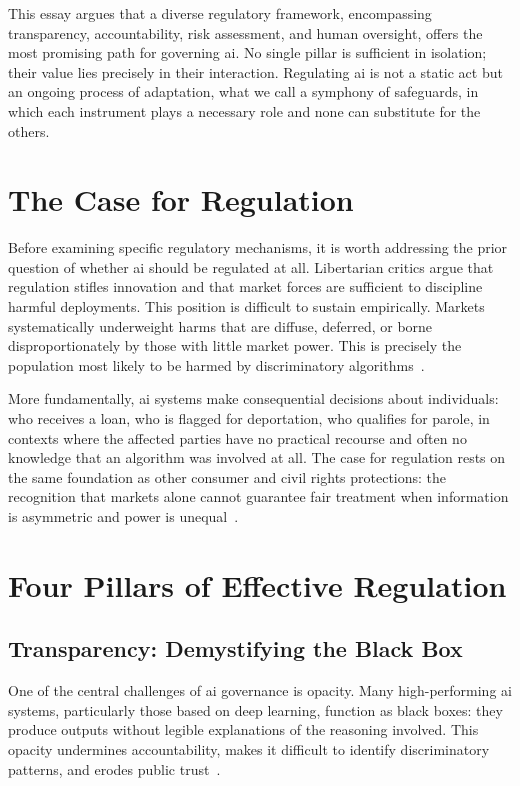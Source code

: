 \documentclass[11pt,showkeys]{essay}
\begin{document}
This essay argues that a diverse regulatory framework, encompassing transparency, accountability, risk assessment, and human oversight, offers the most promising path for governing \gls{ai}. No single pillar is sufficient in isolation; their value lies precisely in their interaction. Regulating \gls{ai} is not a static act but an ongoing process of adaptation, what we call a symphony of safeguards, in which each instrument plays a necessary role and none can substitute for the others.

\section{The Case for Regulation}

Before examining specific regulatory mechanisms, it is worth addressing the prior question of whether \gls{ai} should be regulated at all. Libertarian critics argue that regulation stifles innovation and that market forces are sufficient to discipline harmful deployments. This position is difficult to sustain empirically. Markets systematically underweight harms that are diffuse, deferred, or borne disproportionately by those with little market power. This is precisely the population most likely to be harmed by discriminatory algorithms~\cite{pasquale_black_2015}.

More fundamentally, \gls{ai} systems make consequential decisions about individuals: who receives a loan, who is flagged for deportation, who qualifies for parole, in contexts where the affected parties have no practical recourse and often no knowledge that an algorithm was involved at all. The case for regulation rests on the same foundation as other consumer and civil rights protections: the recognition that markets alone cannot guarantee fair treatment when information is asymmetric and power is unequal~\cite{calo_artificial_2017}.

\section{Four Pillars of Effective Regulation}

\subsection{Transparency: Demystifying the Black Box}

One of the central challenges of \gls{ai} governance is opacity. Many high-performing \gls{ai} systems, particularly those based on deep learning, function as black boxes: they produce outputs without legible explanations of the reasoning involved. This opacity undermines accountability, makes it difficult to identify discriminatory patterns, and erodes public trust~\cite{pasquale_black_2015}.
\end{document}
